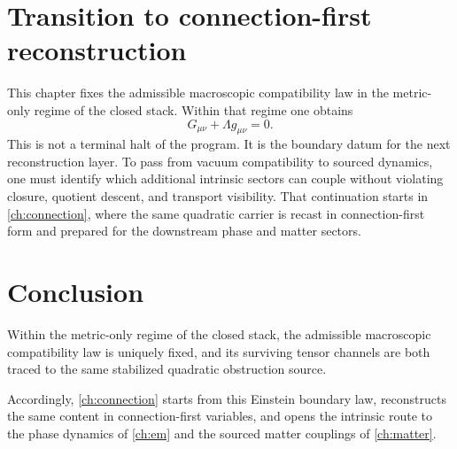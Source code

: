 \section{Transition to connection-first reconstruction}
\label{sec:einstein-transition}
This chapter fixes the admissible macroscopic compatibility law in the
metric-only regime of the closed stack.
Within that regime one obtains
\[
	G_{\mu\nu}+\Lambda g_{\mu\nu}=0.
\]
This is not a terminal halt of the program.
It is the boundary datum for the next reconstruction layer.
To pass from vacuum compatibility to sourced dynamics, one must identify
which additional intrinsic sectors can couple without violating closure,
quotient descent, and transport visibility.
That continuation starts in \cref{ch:connection}, where the same
quadratic carrier is recast in connection-first form and prepared for the
downstream phase and matter sectors.

\section{Conclusion}
\label{sec:einstein-conclusion}
Within the metric-only regime of the closed stack, the admissible
macroscopic compatibility law is uniquely fixed, and its surviving tensor
channels are both traced to the same stabilized quadratic obstruction
source.

Accordingly, \cref{ch:connection} starts from this Einstein boundary law,
reconstructs the same content in connection-first variables, and opens
the intrinsic route to the phase dynamics of \cref{ch:em} and the sourced
matter couplings of \cref{ch:matter}.

\begin{chapterclosing}
\end{chapterclosing}

